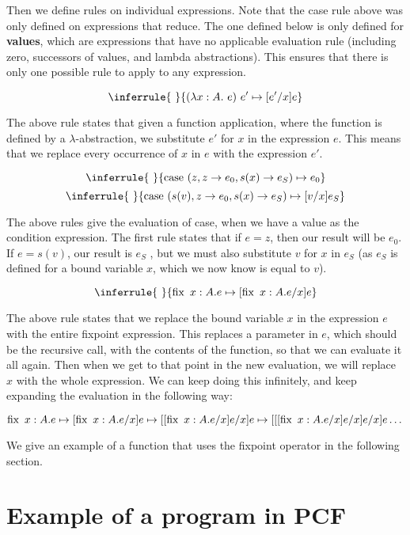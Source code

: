 Then we define rules on individual expressions. Note that the case rule above was only defined on expressions that reduce. The one defined below is only defined for \textbf{values}, which are expressions that have no applicable evaluation rule (including zero, successors of values, and lambda abstractions). This ensures that there is only one possible rule to apply to any expression.



$$
\inferrule{ \ }
 {(\lambda x: A .\ e) \ e' \mapsto [e'/x]e}
$$

The above rule states that given a function application, where the function is defined by a $\lambda$-abstraction, we substitute $e'$ for $x$ in the expression $e$. This means that we replace every occurrence of $x$ in $e$ with the expression $e'$.

$$
\inferrule{ \ }
{\case \ (z, z \to e_0 , s(x) \to e_S) \mapsto e_0}
$$
$$
\inferrule{ \ }
{\case \ (s(v), z \to e_0 , s(x) \to e_S) \mapsto [v/x]e_S}
$$

The above rules give the evaluation of case, when we have a value as the condition expression. The first rule states that if $e = z$, then our result will be $e_0$. If $e = s(v)$, our result is $e_S$ , but we must also substitute $v$ for $x$ in $e_S$ (as $e_S$ is defined for a bound variable $x$, which we now know is equal to $v$).

$$
\inferrule{ \ }
{\fix \ x:A. e \mapsto [\fix \ x:A. e/x]e}
$$

The above rule states that we replace the bound variable $x$ in the expression $e$ with the entire fixpoint expression. This replaces a parameter in $e$, which should be the recursive call, with the contents of the function, so that we can evaluate it all again. Then when we get to that point in the new evaluation, we will replace $x$ with the whole expression. We can keep doing this infinitely, and keep expanding the evaluation in the following way:

\[ \operatorname{fix} \ x:A. e \mapsto [\operatorname{fix} \ x:A. e/x]e \mapsto 
[[\operatorname{fix} \ x:A. e/x]e/x]e
\mapsto
[[[\operatorname{fix} \ x:A. e/x]e/x]e/x]e \dots \]

We give an example of a function that uses the fixpoint operator in the following section.

\section{Example of a program in PCF}



